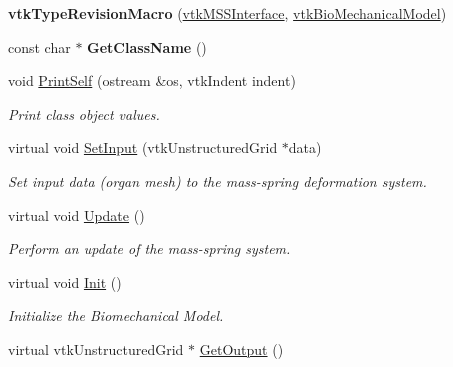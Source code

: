 \begin{DoxyCompactItemize}
\item 
\hypertarget{classvtkMSSInterface_affc5ecb0c7c66d68ae107225347072ef}{
{\bfseries vtkTypeRevisionMacro} (\hyperlink{classvtkMSSInterface}{vtkMSSInterface}, \hyperlink{classvtkBioMechanicalModel}{vtkBioMechanicalModel})}
\label{classvtkMSSInterface_affc5ecb0c7c66d68ae107225347072ef}

\item 
\hypertarget{classvtkMSSInterface_ab647cba98bea1852e4d53e2be3cf8f80}{
const char $\ast$ {\bfseries GetClassName} ()}
\label{classvtkMSSInterface_ab647cba98bea1852e4d53e2be3cf8f80}

\item 
\hypertarget{classvtkMSSInterface_a1acd50c44acb3d4a28269d6ac3012b3f}{
void \hyperlink{classvtkMSSInterface_a1acd50c44acb3d4a28269d6ac3012b3f}{PrintSelf} (ostream \&os, vtkIndent indent)}
\label{classvtkMSSInterface_a1acd50c44acb3d4a28269d6ac3012b3f}

\begin{DoxyCompactList}\small\item\em Print class object values. \item\end{DoxyCompactList}\item 
virtual void \hyperlink{classvtkMSSInterface_a34c770467bd94f9323e956f0fc36c2f4}{SetInput} (vtkUnstructuredGrid $\ast$data)
\begin{DoxyCompactList}\small\item\em Set input data (organ mesh) to the mass-\/spring deformation system. \item\end{DoxyCompactList}\item 
virtual void \hyperlink{classvtkMSSInterface_a542094518ae8779c3bad93206750de9b}{Update} ()
\begin{DoxyCompactList}\small\item\em Perform an update of the mass-\/spring system. \item\end{DoxyCompactList}\item 
\hypertarget{classvtkMSSInterface_afdf90505776fe9e4431c8df912d80944}{
virtual void \hyperlink{classvtkMSSInterface_afdf90505776fe9e4431c8df912d80944}{Init} ()}
\label{classvtkMSSInterface_afdf90505776fe9e4431c8df912d80944}

\begin{DoxyCompactList}\small\item\em Initialize the Biomechanical Model. \item\end{DoxyCompactList}\item 
\hypertarget{classvtkMSSInterface_a8c49d7fce1fb40dd86938fd35dd568e4}{
virtual vtkUnstructuredGrid $\ast$ \hyperlink{classvtkMSSInterface_a8c49d7fce1fb40dd86938fd35dd568e4}{GetOutput} ()}
\label{classvtkMSSInterface_a8c49d7fce1fb40dd86938fd35dd568e4}


\end{DoxyCompactItemize}
